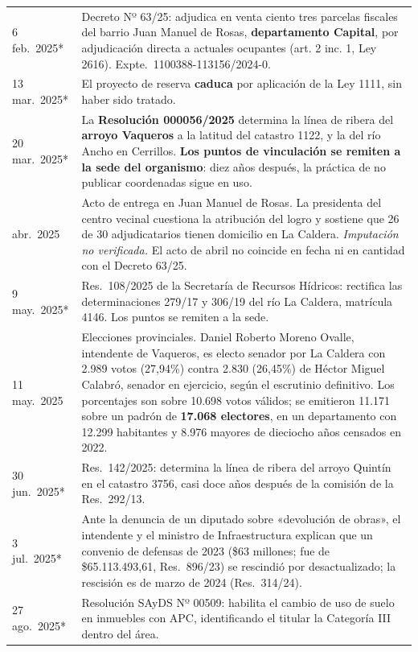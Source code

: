 \begin{longtable}{@{}p{2.7cm}p{10.3cm}@{}}
6 feb.\ 2025* & Decreto Nº 63/25: adjudica en venta ciento tres parcelas fiscales del barrio Juan Manuel de Rosas, \textbf{departamento Capital}, por adjudicación directa a actuales ocupantes (art. 2 inc. 1, Ley 2616). Expte.\ 1100388-113156/2024-0. \\
13 mar.\ 2025* & El proyecto de reserva \textbf{caduca} por aplicación de la Ley 1111, sin haber sido tratado. \\
20 mar.\ 2025* & La \textbf{Resolución 000056/2025} determina la línea de ribera del \textbf{arroyo Vaqueros} a la latitud del catastro 1122, y la del río Ancho en Cerrillos. \textbf{Los puntos de vinculación se remiten a la sede del organismo}: diez años después, la práctica de no publicar coordenadas sigue en uso. \\
abr.\ 2025 & Acto de entrega en Juan Manuel de Rosas. La presidenta del centro vecinal cuestiona la atribución del logro y sostiene que 26 de 30 adjudicatarios tienen domicilio en La Caldera. \textit{Imputación no verificada.} El acto de abril no coincide en fecha ni en cantidad con el Decreto 63/25. \\
9 may.\ 2025* & Res.\ 108/2025 de la Secretaría de Recursos Hídricos: rectifica las determinaciones 279/17 y 306/19 del río La Caldera, matrícula 4146. Los puntos se remiten a la sede. \\
11 may.\ 2025 & Elecciones provinciales. Daniel Roberto Moreno Ovalle\index{Moreno Ovalle, Daniel Roberto}, intendente de Vaqueros, es electo senador por La Caldera con 2.989 votos (27,94\%) contra 2.830 (26,45\%) de Héctor Miguel Calabró\index{Calabró, Héctor Miguel}, senador en ejercicio, según el escrutinio definitivo. Los porcentajes son sobre 10.698 votos válidos; se emitieron 11.171 sobre un padrón de \textbf{17.068 electores}, en un departamento con 12.299 habitantes y 8.976 mayores de dieciocho años censados en 2022. \\
30 jun.\ 2025* & Res.\ 142/2025: determina la línea de ribera del arroyo Quintín en el catastro 3756, casi doce años después de la comisión de la Res.\ 292/13. \\
3 jul.\ 2025* & Ante la denuncia de un diputado sobre «devolución de obras», el intendente y el ministro de Infraestructura explican que un convenio de defensas de 2023 (\$63 millones; fue de \$65.113.493,61, Res.\ 896/23) se rescindió por desactualizado; la rescisión es de marzo de 2024 (Res.\ 314/24). \\
27 ago.\ 2025* & Resolución SAyDS Nº 00509: habilita el cambio de uso de suelo en inmuebles con APC, identificando el titular la Categoría III dentro del área. \\

\end{longtable}
